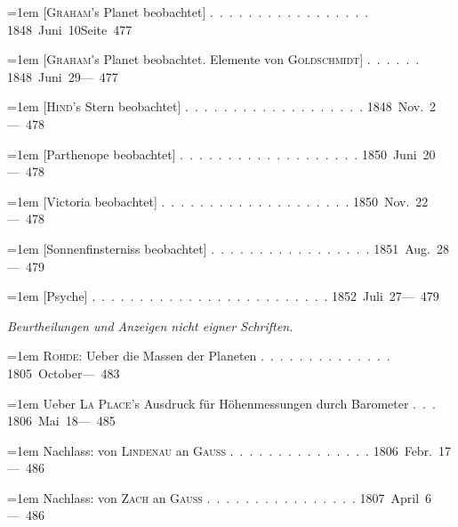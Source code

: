 \clearpage
{}
\begingroup
\raggedright
\noindent\hangindent=1em [\textsc{Graham}'s Planet beobachtet] \mbox{.\ .\ .\ .\ .\ .\ .\ .\ .\ .\ .\ .\ .\ .\ .\ .\ .} \hfill\mbox{1848 Juni 10}\quad\mbox{Seite 477}\par\smallskip
\noindent\hangindent=1em [\textsc{Graham}'s Planet beobachtet. Elemente von \textsc{Goldschmidt}] \mbox{.\ .\ .\ .\ .\ .} \hfill\mbox{1848 Juni 29}\quad\mbox{--- 477}\par\smallskip
\noindent\hangindent=1em [\textsc{Hind}'s Stern beobachtet] \mbox{.\ .\ .\ .\ .\ .\ .\ .\ .\ .\ .\ .\ .\ .\ .\ .\ .\ .\ .} \hfill\mbox{1848 Nov. 2}\quad\mbox{--- 478}\par\smallskip
\noindent\hangindent=1em [Parthenope beobachtet] \mbox{.\ .\ .\ .\ .\ .\ .\ .\ .\ .\ .\ .\ .\ .\ .\ .\ .\ .\ .} \hfill\mbox{1850 Juni 20}\quad\mbox{--- 478}\par\smallskip
\noindent\hangindent=1em [Victoria beobachtet] \mbox{.\ .\ .\ .\ .\ .\ .\ .\ .\ .\ .\ .\ .\ .\ .\ .\ .\ .\ .\ .} \hfill\mbox{1850 Nov. 22}\quad\mbox{--- 478}\par\smallskip
\noindent\hangindent=1em [Sonnenfinsterniss beobachtet] \mbox{.\ .\ .\ .\ .\ .\ .\ .\ .\ .\ .\ .\ .\ .\ .\ .\ .} \hfill\mbox{1851 Aug. 28}\quad\mbox{--- 479}\par\smallskip
\noindent\hangindent=1em [Psyche] \mbox{.\ .\ .\ .\ .\ .\ .\ .\ .\ .\ .\ .\ .\ .\ .\ .\ .\ .\ .\ .\ .\ .\ .\ .\ .} \hfill\mbox{1852 Juli 27}\quad\mbox{--- 479}\par\smallskip
\bigskip\noindent\textit{Beurtheilungen und Anzeigen nicht eigner Schriften.}\par\medskip
\noindent\hangindent=1em \textsc{Rohde}: Ueber die Massen der Planeten \mbox{.\ .\ .\ .\ .\ .\ .\ .\ .\ .\ .\ .\ .\ .} \hfill\mbox{1805 October}\quad\mbox{--- 483}\par\smallskip
\noindent\hangindent=1em Ueber \textsc{La Place}'s Ausdruck für Höhenmessungen durch Barometer \mbox{.\ .\ .} \hfill\mbox{1806 Mai 18}\quad\mbox{--- 485}\par\smallskip
\noindent\hangindent=1em Nachlass: von \textsc{Lindenau} an \textsc{Gauss} \mbox{.\ .\ .\ .\ .\ .\ .\ .\ .\ .\ .\ .\ .\ .\ .} \hfill\mbox{1806 Febr. 17}\quad\mbox{--- 486}\par\smallskip
\noindent\hangindent=1em Nachlass: von \textsc{Zach} an \textsc{Gauss} \mbox{.\ .\ .\ .\ .\ .\ .\ .\ .\ .\ .\ .\ .\hspace{.6em}\ .\ .\ .} \hfill\mbox{1807 April 6}\quad\mbox{--- 486}\par\smallskip
